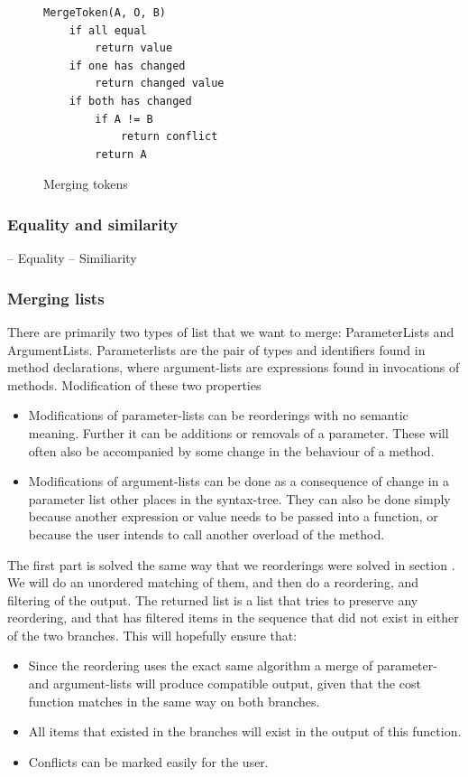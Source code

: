 \documentclass[11pt]{article}
\begin{document}
\begin{figure}
  \caption{Merging tokens}
  \label{MergeToken}
\begin{verbatim}
MergeToken(A, O, B)
    if all equal
        return value
    if one has changed
        return changed value
    if both has changed 
        if A != B
            return conflict
        return A
\end{verbatim}
\end{figure}


\subsubsection{Equality and similarity}
-- Equality
-- Similiarity

\subsubsection{Merging lists}
There are primarily two types of list that we want to merge: ParameterLists and ArgumentLists. Parameterlists are the pair of types and identifiers found in method declarations, where argument-lists are expressions found in invocations of methods. Modification of these two properties 

\begin{itemize}
   \item Modifications of parameter-lists can be reorderings with no semantic meaning. Further it can be additions or removals of a parameter. These will often also be accompanied by some change in the behaviour of a method.
   \item Modifications of argument-lists can be done as a consequence of change in a parameter list other places in the syntax-tree. They can also be done simply because another expression or value needs to be passed into a function, or because the user intends to call another overload of the method.
\end{itemize}

The first part is solved the same way that we reorderings were solved in section . We will do an unordered matching of them, and then do a reordering, and filtering of the output. The returned list is a list that tries to preserve any reordering, and that has filtered items in the sequence that did not exist in either of the two branches. This will hopefully ensure that:

\begin{itemize}
   \item Since the reordering uses the exact same algorithm a merge of parameter- and argument-lists will produce compatible output, given that the cost function matches in the same way on both branches.
   \item All items that existed in the branches will exist in the output of this function. 
   \item Conflicts can be marked easily for the user.
\end{itemize}
\end{document}
